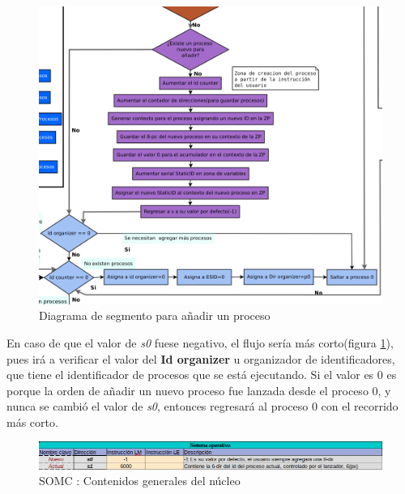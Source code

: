 \documentclass[letterpaper,12pt,oneside]{book}
\begin{document}
		\begin{figure}[h]		
			\centering
			\includegraphics[scale=0.4]{media/CARDIACC/DiagAddNewProcces.png}
			\caption{Diagrama de segmento para añadir un proceso}
			\label{fig:diagAddnewprocess}
		\end{figure}


			En caso de que el valor de \textit{s0} fuese negativo, el flujo sería más corto(figura \ref{fig:diagAddnewprocess}), pues irá a verificar el valor del \textbf{Id organizer} u organizador de identificadores, que tiene el identificador de procesos que se está ejecutando. Si el valor es 0 es porque 
            la orden de añadir un nuevo proceso fue lanzada desde el proceso 0,  y
			nunca se cambió el valor de \textit{s0}, entonces regresará al proceso 0 con el recorrido más corto.
  
        \begin{figure}[H]		
			\centering
			\includegraphics[scale=0.55]{media/CARDIACC/SOMCGeneralNucleo.png}
			\caption{SOMC : Contenidos generales del núcleo}
			\label{fig:somcGeneralnucleo}
		\end{figure}
  
\end{document}
